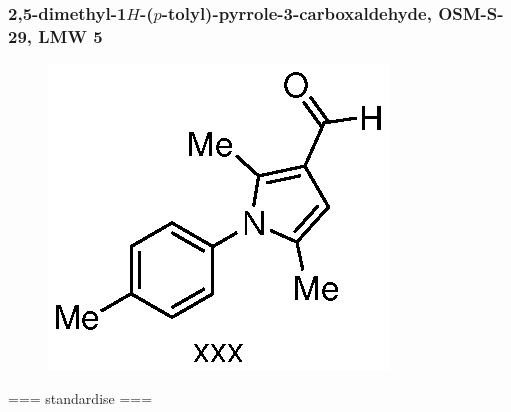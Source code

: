 \documentclass[12pt, a4paper,titlepage]{article}
\begin{document}
\subsubsection*{2,5-dimethyl-1$H$-($p$-tolyl)-pyrrole-3-carboxaldehyde, OSM-S-29, LMW 5}
\label{exp:LMW5}
	\begin{figure}[H]
	\begin{center}
	\includegraphics{exp/LMW5.eps}
	\end{center}
	\vspace{-25pt}	
	\end{figure}	

=== standardise ===
\end{document}
